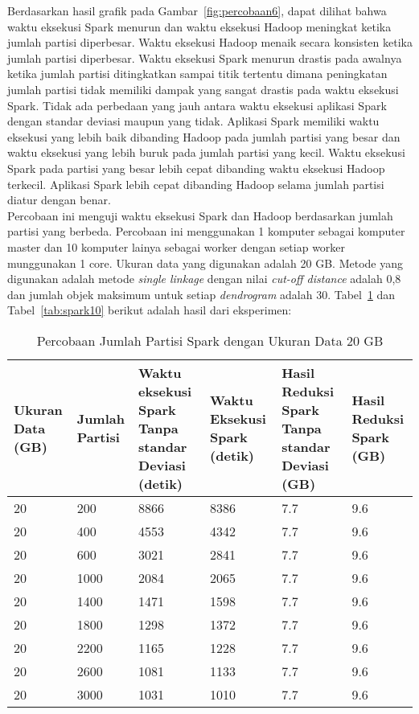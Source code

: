 Berdasarkan hasil grafik pada Gambar~\ref{fig:percobaan6}, dapat dilihat bahwa waktu eksekusi Spark menurun dan waktu eksekusi Hadoop meningkat ketika jumlah partisi diperbesar. Waktu eksekusi Hadoop menaik secara konsisten ketika jumlah partisi diperbesar. Waktu eksekusi Spark menurun drastis pada awalnya ketika jumlah partisi ditingkatkan sampai titik tertentu dimana peningkatan jumlah partisi tidak memiliki dampak yang sangat drastis pada waktu eksekusi Spark. Tidak ada perbedaan yang jauh antara waktu eksekusi aplikasi Spark dengan standar deviasi maupun yang tidak. Aplikasi Spark memiliki waktu eksekusi yang lebih baik dibanding Hadoop pada jumlah partisi yang besar dan waktu eksekusi yang lebih buruk pada jumlah partisi yang kecil. Waktu eksekusi Spark pada partisi yang besar lebih cepat dibanding waktu eksekusi Hadoop terkecil. Aplikasi Spark lebih cepat dibanding Hadoop selama jumlah partisi diatur dengan benar.\\




Percobaan ini menguji waktu eksekusi Spark dan Hadoop berdasarkan jumlah partisi yang berbeda. Percobaan ini menggunakan 1 komputer sebagai komputer master dan 10 komputer lainya sebagai worker dengan setiap worker munggunakan 1 core. Ukuran data yang digunakan adalah 20 GB. Metode yang digunakan adalah metode \textit{single linkage} dengan nilai \textit{cut-off distance} adalah 0,8 dan jumlah objek maksimum untuk setiap \textit{dendrogram} adalah 30. Tabel~\ref{tab:spark9} dan Tabel~\ref{tab:spark10} berikut adalah hasil dari eksperimen:

\begin{table}[H] 
	\centering 
	\caption{Percobaan Jumlah Partisi Spark dengan Ukuran Data 20 GB}
	\label{tab:spark9}
	\begin{tabular}{|p{1cm}|p{1cm}|p{3cm}|p{3cm}|p{3cm}|p{3cm}|}
\hline
Ukuran Data (GB) & Jumlah Partisi &  Waktu eksekusi Spark Tanpa standar Deviasi (detik) & Waktu Eksekusi Spark (detik) & Hasil Reduksi Spark Tanpa standar Deviasi (GB) & Hasil Reduksi Spark (GB)  \\ 
\hline
20 & 200 & 8866  & 8386  & 7.7 & 9.6 \\
\hline
20 & 400 & 4553  & 4342  & 7.7 & 9.6 \\
\hline
20 & 600 & 3021  & 2841  &  7.7 & 9.6 \\
\hline
20 & 1000 & 2084  & 2065  & 7.7 & 9.6 \\
\hline
20 & 1400 & 1471  & 1598  & 7.7 & 9.6 \\
\hline
20 & 1800 & 1298  & 1372  & 7.7 & 9.6 \\
\hline
20 & 2200 & 1165  & 1228  & 7.7 & 9.6 \\
\hline
20 & 2600 & 1081  & 1133  & 7.7 & 9.6 \\
\hline
20 & 3000 & 1031  & 1010  & 7.7 & 9.6 \\
\hline

\hline

	\end{tabular} 
\end{table}



